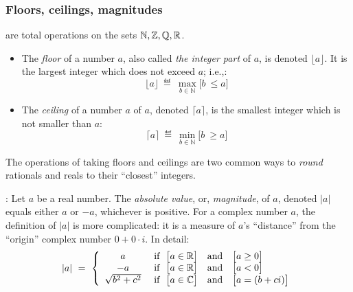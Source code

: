 \subsubsection{Floors, ceilings, magnitudes}


 are total operations on the sets $\mathbb{N}, \mathbb{Z}, \mathbb{Q}, \mathbb{R}$.
\begin{itemize}
\item
The {\it floor} of a number $a$, also called {\it the integer part} of $a$, is denoted $\lfloor a \rfloor$.  It is the largest integer which does not exceed $a$; i.e.,:
\[ \lfloor a \rfloor \ \eqdef \ \max_{b \in {\mathbb{N}}} \Big[ b \ \leq a \Big] \]
\medskip\item
The {\it ceiling} of a number $a$ of $a$, denoted $\lceil a \rceil$, is the smallest integer which is 
not smaller than $a$:
\[ \lceil a \rceil \ \eqdef \ \min_{b \in {\mathbb{N}}} \Big[ b \ \geq a \Big] \]
\end{itemize}
The operations of taking floors and ceilings are two common ways to {\em round} rationals and reals to their ``closest'' integers.

\medskip

:
Let $a$ be a real number.  The {\it absolute value}, or, {\it magnitude}, of $a$, denoted $|a|$ equals either $a$ or $-a$, whichever is positive.  For a complex number $a$, the definition of
$|a|$ is more complicated: it is a measure of $a$'s ``distance'' from the ``origin'' complex number $0 + 0 \cdot i$.  In detail:
\[
|a| \ = \ \left\{
\begin{array}{cl}
a & \mbox{ if } \ \big[a \in \mathbb{R} \big] \ \ \mbox{ and } \ \ \big[a \geq 0\big] \\
-a & \mbox{ if } \ \big[a \in \mathbb{R}\big] \ \ \mbox{ and } \ \ \big[a < 0\big] \\
\sqrt{b^2 + c^2} &  \mbox{ if } \ \big[a \in \mathbb{C}\big]  \ \ \mbox{ and }  \ \ \big[a = (b+ci)\big]
\end{array}
\right.
\]

